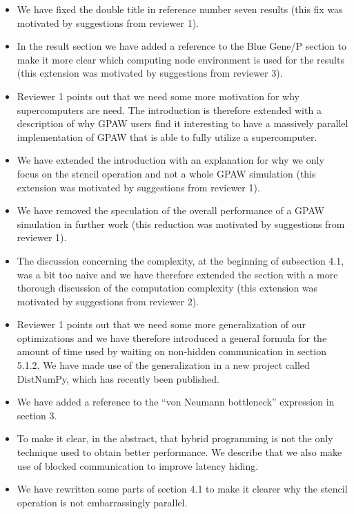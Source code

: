 \documentclass[preprint,3p,times]{elsarticle}
\begin{document}
\begin{itemize}
\item We have fixed the double title in reference number seven results (this fix was motivated by suggestions from reviewer 1).

\item In the result section we have added a reference to the Blue Gene/P section to make it more clear which computing node environment is used for the results (this extension was motivated by suggestions from reviewer 3).

\item Reviewer 1 points out that we need some more motivation for why supercomputers are need. The introduction is therefore extended with a description of why GPAW users find it interesting to have a massively parallel implementation of GPAW that is able to fully utilize a supercomputer.

\item We have extended the introduction with an explanation for why we only focus on the stencil operation and not a whole GPAW simulation (this extension was motivated by suggestions from reviewer 1).

\item We have removed the speculation of the overall performance of a GPAW simulation in further work (this reduction was motivated by suggestions from reviewer 1).

\item The discussion concerning the complexity, at the beginning of subsection 4.1, was a bit too naive and we have therefore extended the section with a more thorough discussion of the computation complexity (this extension was motivated by suggestions from reviewer 2).

\item Reviewer 1 points out that we need some more generalization of our optimizations and we have therefore introduced a general formula for the amount of time used by waiting on non-hidden communication in section 5.1.2. We have made use of the generalization in a new project called DistNumPy\cite{PGAS10}, which has recently been published.

\item We have added a reference to the ``von Neumann bottleneck'' expression in section 3.

\item To make it clear, in the abstract, that hybrid programming is not the only technique used to obtain better performance. We describe that we also make use of blocked communication to improve latency hiding.

\item We have rewritten some parts of section 4.1 to make it clearer why the stencil operation is not embarrassingly parallel.
\end{itemize}




\end{document}
